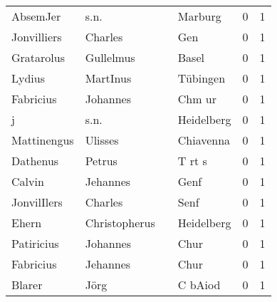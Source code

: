 \documentclass[10pt,a4paper,landscape]{article}
\begin{document}
\begin{longtable}{llllrr}
                 AbsemJer &                               s.n. &             &                                     Marburg &          0 &         1 \\
              Jonvilliers &                            Charles &             &                                         Gen &          0 &         1 \\
               Gratarolus &                          Gullelmus &             &                                       Basel &          0 &         1 \\
                   Lydius &                           MartInus &             &                                    Tübingen &          0 &         1 \\
                Fabricius &                           Johannes &             &                                      Chm ur &          0 &         1 \\
                        j &                               s.n. &             &                                  Heidelberg &          0 &         1 \\
              Mattinengus &                            Ulisses &             &                                   Chiavenna &          0 &         1 \\
                 Dathenus &                             Petrus &             &                                      T rt s &          0 &         1 \\
                   Calvin &                           Jehannes &             &                                        Genf &          0 &         1 \\
              JonvilIlers &                            Charles &             &                                        Senf &          0 &         1 \\
                    Ehern &                      Christopherus &             &                                  Heidelberg &          0 &         1 \\
               Patiricius &                           Johannes &             &                                        Chur &          0 &         1 \\
                Fabricius &                           Jehannes &             &                                        Chur &          0 &         1 \\
                   Blarer &                               Jörg &             &                                     C bAiod &          0 &         1 \\

\end{longtable}
\end{document}
